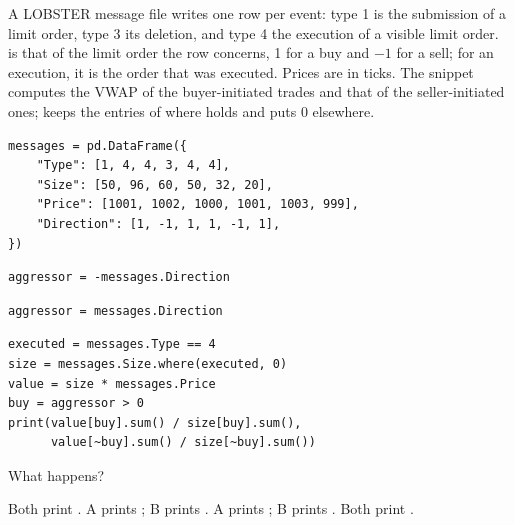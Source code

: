 \begin{question}
\label{question.lobsterAggressorIsMinusDirection}
A LOBSTER message file writes one row per event:
type 1 is the submission of a limit order,
type 3 its deletion,
and type 4 the execution of a visible limit order.
 is that of the limit order the row concerns,
1 for a buy and $-1$ for a sell;
for an execution, it is the order that was executed.
Prices are in ticks.
The snippet computes the VWAP of the buyer-initiated trades and that of the seller-initiated ones;
 keeps the entries of  where  holds and puts 0 elsewhere.
\begin{lstlisting}[caption={Six rows of a message file}, label=listing.lobsterMessages]
messages = pd.DataFrame({
    "Type": [1, 4, 4, 3, 4, 4],
    "Size": [50, 96, 60, 50, 32, 20],
    "Price": [1001, 1002, 1000, 1001, 1003, 999],
    "Direction": [1, -1, 1, 1, -1, 1],
})
\end{lstlisting}
\begin{lstlisting}[caption={Alternative A}, label=listing.lobsterAggressorA]
aggressor = -messages.Direction
\end{lstlisting}
\begin{lstlisting}[caption={Alternative B}, label=listing.lobsterAggressorB]
aggressor = messages.Direction
\end{lstlisting}
\begin{lstlisting}[caption={Run after each alternative}, label=listing.lobsterAggressorRun]
executed = messages.Type == 4
size = messages.Size.where(executed, 0)
value = size * messages.Price
buy = aggressor > 0
print(value[buy].sum() / size[buy].sum(),
      value[~buy].sum() / size[~buy].sum())
\end{lstlisting}
What happens?
\begin{choices}
 \choice Both print .
 \correctchoice A prints ; B prints .
 \choice A prints ; B prints .
 \choice Both print .
\end{choices}
\end{question}
